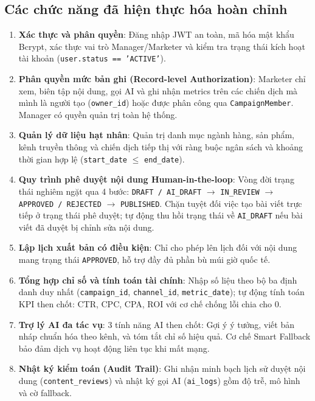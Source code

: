 \subsection{Các chức năng đã hiện thực hóa hoàn chỉnh}
\begin{enumerate}
  \item \textbf{Xác thực và phân quyền}: Đăng nhập JWT an toàn, mã hóa mật khẩu Bcrypt, xác thực vai trò Manager/Marketer và kiểm tra trạng thái kích hoạt tài khoản (\texttt{user.status == 'ACTIVE'}).
  \item \textbf{Phân quyền mức bản ghi (Record-level Authorization)}: Marketer chỉ xem, biên tập nội dung, gọi AI và ghi nhận metrics trên các chiến dịch mà mình là người tạo (\texttt{owner\_id}) hoặc được phân công qua \texttt{CampaignMember}. Manager có quyền quản trị toàn hệ thống.
  \item \textbf{Quản lý dữ liệu hạt nhân}: Quản trị danh mục ngành hàng, sản phẩm, kênh truyền thông và chiến dịch tiếp thị với ràng buộc ngân sách và khoảng thời gian hợp lệ (\texttt{start\_date} $\le$ \texttt{end\_date}).
  \item \textbf{Quy trình phê duyệt nội dung Human-in-the-loop}: Vòng đời trạng thái nghiêm ngặt qua 4 bước: \texttt{DRAFT / AI\_DRAFT} $\rightarrow$ \texttt{IN\_REVIEW} $\rightarrow$ \texttt{APPROVED / REJECTED} $\rightarrow$ \texttt{PUBLISHED}. Chặn tuyệt đối việc tạo bài viết trực tiếp ở trạng thái phê duyệt; tự động thu hồi trạng thái về \texttt{AI\_DRAFT} nếu bài viết đã duyệt bị chỉnh sửa nội dung.
  \item \textbf{Lập lịch xuất bản có điều kiện}: Chỉ cho phép lên lịch đối với nội dung mang trạng thái \texttt{APPROVED}, hỗ trợ đầy đủ phần bù múi giờ quốc tế.
  \item \textbf{Tổng hợp chỉ số và tính toán tài chính}: Nhập số liệu theo bộ ba định danh duy nhất (\texttt{campaign\_id}, \texttt{channel\_id}, \texttt{metric\_date}); tự động tính toán KPI then chốt: CTR, CPC, CPA, ROI với cơ chế chống lỗi chia cho 0.
  \item \textbf{Trợ lý AI đa tác vụ}: 3 tính năng AI then chốt: Gợi ý ý tưởng, viết bản nháp chuẩn hóa theo kênh, và tóm tắt chỉ số hiệu quả. Cơ chế Smart Fallback bảo đảm dịch vụ hoạt động liên tục khi mất mạng.
  \item \textbf{Nhật ký kiểm toán (Audit Trail)}: Ghi nhận minh bạch lịch sử duyệt nội dung (\texttt{content\_reviews}) và nhật ký gọi AI (\texttt{ai\_logs}) gồm độ trễ, mô hình và cờ fallback.
\end{enumerate}

